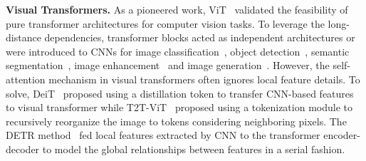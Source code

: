 \documentclass[10pt,twocolumn,letterpaper]{article}
\begin{document}
\noindent\textbf{Visual Transformers.}
As a pioneered work, ViT~\cite{ViT2020} validated the feasibility of pure transformer architectures for computer vision tasks. To leverage the long-distance dependencies,  transformer blocks acted as independent architectures or  were introduced to CNNs for image classification~\cite{VT2020,DeiT2020,T2TViT2021}, object detection~\cite{DETR2020,DefomableDETR2020,ViTFRCNN2020}, semantic segmentation~\cite{SETR2020}, image enhancement~\cite{PiT2020} and image generation~\cite{iGPT2020,TransGAN2021}. However, the self-attention mechanism in visual transformers often ignores local feature details. To solve, DeiT~\cite{DeiT2020} proposed using a distillation token to transfer CNN-based features to visual transformer while T2T-ViT~\cite{T2TViT2021} proposed using a tokenization module to recursively reorganize the image to tokens considering neighboring pixels. The DETR method~\cite{DETR2020,DefomableDETR2020} fed local features extracted by CNN to the transformer encoder-decoder to model the global relationships between features in a serial fashion.
\end{document}
